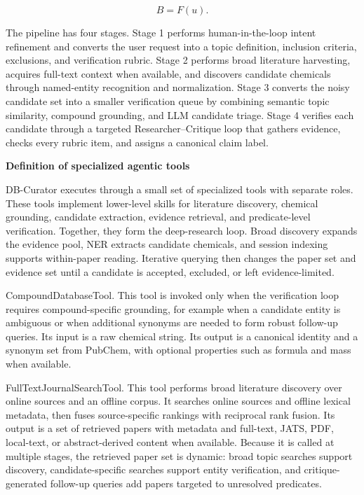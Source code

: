 \documentclass[
]{article}
\begin{document}
\[B = F(u).\]

The pipeline has four stages. Stage 1 performs human-in-the-loop intent
refinement and converts the user request into a topic definition,
inclusion criteria, exclusions, and verification rubric. Stage 2 performs
broad literature harvesting, acquires full-text context when available,
and discovers candidate chemicals through named-entity recognition and
normalization. Stage 3 converts the noisy candidate set into a smaller
verification queue by combining semantic topic similarity, compound
grounding, and LLM candidate triage. Stage 4 verifies each candidate
through a targeted Researcher--Critique loop that gathers evidence,
checks every rubric item, and assigns a canonical claim label.

\textbf{Definition of specialized agentic tools}

DB-Curator executes through a small set of specialized tools with
separate roles. These tools implement lower-level skills for literature
discovery, chemical grounding, candidate extraction, evidence retrieval,
and predicate-level verification. Together, they form the deep-research
loop. Broad discovery expands the evidence pool, NER extracts candidate
chemicals, and session indexing supports within-paper reading.
Iterative querying then changes the paper set and evidence set until a
candidate is accepted, excluded, or left evidence-limited.

CompoundDatabaseTool. This tool is invoked only when the verification
loop requires compound-specific grounding, for example when a candidate
entity is ambiguous or when additional synonyms are needed to form
robust follow-up queries. Its input is a raw chemical string. Its output
is a canonical identity and a synonym set from PubChem, with optional
properties such as formula and mass when available.

FullTextJournalSearchTool. This tool performs broad literature
discovery over online sources and an offline corpus. It searches online
sources and offline lexical metadata, then fuses source-specific rankings
with reciprocal rank fusion.
Its output is a set of retrieved papers with metadata and full-text,
JATS, PDF, local-text, or abstract-derived content when available.
Because it is called at multiple stages, the retrieved paper set is
dynamic: broad topic searches support discovery, candidate-specific
searches support entity verification, and critique-generated follow-up
queries add papers targeted to unresolved predicates.
\end{document}
